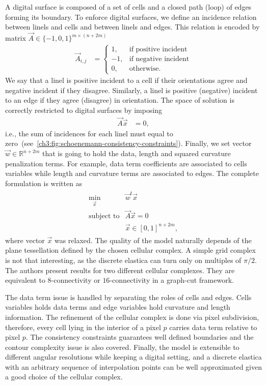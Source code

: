 A digital surface is composed of a set of cells and a closed path (loop) of edges forming its boundary. To enforce digital surfaces, we define an incidence relation between linels and cells and between linels and edges. This relation is encoded by matrix $\vec{A} \in \{-1,0,1\}^{m\times(n+2m)}$ 
\begin{align*}
	\vec{A}_{i,j} &= \left\{ \begin{array}{rl}
		1,& \text{if positive incident}\\
		-1,& \text{if negative incident}\\
		0,& \text{otherwise}.		
	\end{array}\right.
\end{align*}
%
We say that a linel is positive incident to a cell if their orientations agree and negative incident if they disagree. Similarly, a linel is positive (negative) incident to an edge if they agree (disagree) in orientation. The space of solution is correctly restricted to digital surfaces by imposing
\begin{align*}
	\vec{A}\vec{x} &=0,
\end{align*}
%
i.e., the sum of incidences for each linel must equal to zero~(see~\cref{ch3:fig:schoenemann-consistency-constraints}). Finally, we set vector $\vec{w} \in \mathbb{R}^{n+2m}$ that is going to hold the data, length and squared curvature penalization terms. For example, data term coefficients are associated to cells variables while length and curvature terms are associated to edges. The complete formulation is written as
\begin{align*}
	\begin{array}{rl}
		\min_{\vec{x}} & \vec{w}^t\vec{x}\\
		\text{subject to} & \vec{A}\vec{x} = 0 \\
		& \vec{x} \in [0,1]^{n+2m},
	\end{array}
\end{align*}
%
%
where vector $\vec{x}$ was relaxed. The quality of the model naturally depends of the plane tessellation defined by the chosen cellular complex. A simple grid complex is not that interesting, as the discrete elastica can turn only on multiples of $\pi/2$. The authors present results for two different cellular complexes. They are equivalent to $8$-connectivity or $16$-connectivity in a graph-cut framework. 

The data term issue is handled by separating the roles of cells and edges. Cells variables holds data terms and edge variables hold curvature and length information. The refinement of the cellular complex is done via pixel subdivision, therefore, every cell lying in the interior of a pixel $p$ carries data term relative to pixel $p$. The consistency constraints guarantees well defined boundaries and the contour complexity issue is also covered. Finally, the model is extensible to different angular resolutions while keeping a digital setting, and a discrete elastica with an arbitrary sequence of interpolation points can be well approximated given a good choice of the cellular complex.

